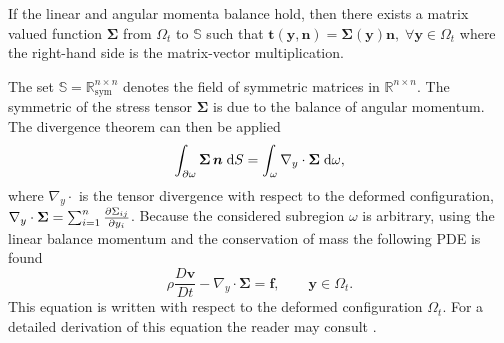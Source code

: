 \begin{theorem}
If the linear and angular momenta balance hold, then there exists a matrix valued function $\bm{\Sigma}$ from $\Omega_t$ to $\mathbb{S}$ such
that $\bm{t}(\bm{y}, \bm{n}) = \bm{\Sigma}(\bm{y}) \bm{n}, \; \forall \bm{y} \in \Omega_t$ where the right-hand side is the matrix-vector multiplication.
\end{theorem}
The set $\mathbb{S}=\mathbb{R}^{n\times n}_{\mathrm{sym}}$ denotes the field of symmetric matrices in $\mathbb{R}^{n\times n}$. The symmetric of the stress tensor $\bm{\Sigma}$ is due to the balance of angular momentum. The divergence theorem can then be applied
\begin{equation*}
\int_{\partial \omega} \bm{\Sigma} \, \bm{n} \d{S} = \int_{\omega} \nabla_y \cdot\bm{\Sigma} \d{\omega},
\end{equation*}
where $\nabla_y \cdot$ is the tensor divergence with respect to the deformed configuration, $\nabla_y \cdot\bm{\Sigma} = \sum_{i=1}^{n}\diffp{\Sigma_{ij}}{y_i}$.
Because the considered subregion $\omega$ is arbitrary, using the linear balance momentum and the conservation of mass the following PDE is found
\begin{equation*}
	\rho \frac{D\bm{v}}{Dt} - \nabla_y \cdot{\bm{\Sigma}} = \bm{f}, \qquad \bm{y} \in \Omega_t.
\end{equation*}
This equation is written with respect to the deformed configuration $\Omega_t$. For a detailed derivation of this equation the reader may consult \cite[Chapter 4]{abeyaratne2012notes}.

